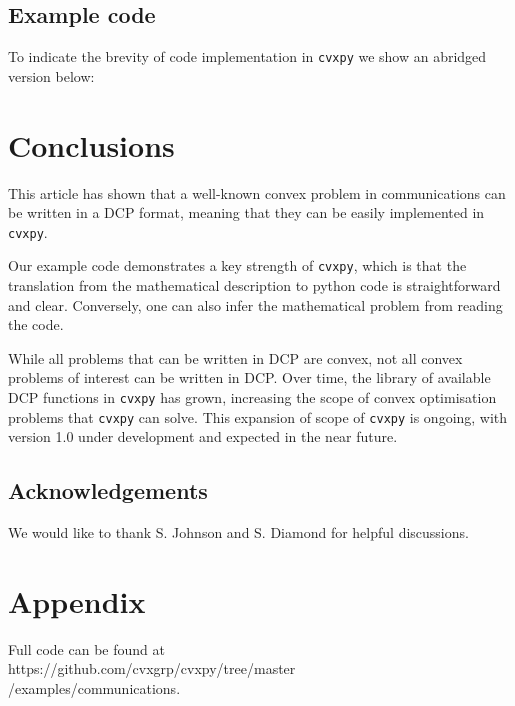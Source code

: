 \documentclass[twocolumn,secnumarabic,amssymb, nobibnotes, aps, prl,superscriptaddress]{revtex4-1}
\begin{document}
\subsection{Example code}
To indicate the brevity of code implementation in \texttt{cvxpy} we show an abridged version below: 

\section{Conclusions}
This article has shown that a well-known convex problem in communications can be written in a DCP format, meaning that they can be easily implemented in \texttt{cvxpy}.

Our example code demonstrates a key strength of \texttt{cvxpy}, which is that the translation from the mathematical description to python code is straightforward and clear.  Conversely, one can also infer the mathematical problem from reading the code.

While all problems that can be written in DCP are convex, not all convex problems of interest can be written in DCP.  Over time, the library of available DCP functions in \texttt{cvxpy} has grown, increasing the scope of convex optimisation problems that \texttt{cvxpy} can solve.  This expansion of scope of \texttt{cvxpy} is ongoing, with version 1.0 under development and expected in the near future.


\subsection*{Acknowledgements}
We would like to thank S. Johnson and S. Diamond for helpful discussions.

\section*{Appendix}
Full code can be found at\\ https://github.com/cvxgrp/cvxpy/tree/master\\/examples/communications.

\vspace{1cm}
 


\end{document}
